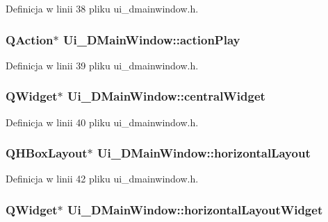 Definicja w linii 38 pliku ui\-\_\-dmainwindow.\-h.

\hypertarget{class_ui___d_main_window_a6cfb6311ca1dd6e247d80255e2667ba7}{
\subsubsection[{action\-Play}]{\setlength{\rightskip}{0pt plus 5cm}Q\-Action$\ast$ Ui\-\_\-\-D\-Main\-Window\-::action\-Play}}\label{class_ui___d_main_window_a6cfb6311ca1dd6e247d80255e2667ba7}


Definicja w linii 39 pliku ui\-\_\-dmainwindow.\-h.

\hypertarget{class_ui___d_main_window_a94cf40cb4e645cfa2e80f36ffbf5018e}{
\subsubsection[{central\-Widget}]{\setlength{\rightskip}{0pt plus 5cm}Q\-Widget$\ast$ Ui\-\_\-\-D\-Main\-Window\-::central\-Widget}}\label{class_ui___d_main_window_a94cf40cb4e645cfa2e80f36ffbf5018e}


Definicja w linii 40 pliku ui\-\_\-dmainwindow.\-h.

\hypertarget{class_ui___d_main_window_a4ab6ff85d8c5edef531b3f2111a04157}{
\subsubsection[{horizontal\-Layout}]{\setlength{\rightskip}{0pt plus 5cm}Q\-H\-Box\-Layout$\ast$ Ui\-\_\-\-D\-Main\-Window\-::horizontal\-Layout}}\label{class_ui___d_main_window_a4ab6ff85d8c5edef531b3f2111a04157}


Definicja w linii 42 pliku ui\-\_\-dmainwindow.\-h.

\hypertarget{class_ui___d_main_window_a777a56f3b74aa5b5cd5ff2c62a2968a9}{
\subsubsection[{horizontal\-Layout\-Widget}]{\setlength{\rightskip}{0pt plus 5cm}Q\-Widget$\ast$ Ui\-\_\-\-D\-Main\-Window\-::horizontal\-Layout\-Widget}}\label{class_ui___d_main_window_a777a56f3b74aa5b5cd5ff2c62a2968a9}


